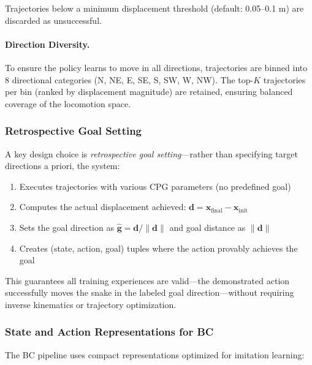 \documentclass[11pt]{article}
\begin{document}
Trajectories below a minimum displacement threshold (default: 0.05--0.1 m) are discarded as unsuccessful.

\paragraph{Direction Diversity.}
To ensure the policy learns to move in all directions, trajectories are binned into 8 directional categories (N, NE, E, SE, S, SW, W, NW). The top-$K$ trajectories per bin (ranked by displacement magnitude) are retained, ensuring balanced coverage of the locomotion space.

\subsubsection{Retrospective Goal Setting}

A key design choice is \emph{retrospective goal setting}---rather than specifying target directions a priori, the system:
\begin{enumerate}
    \item Executes trajectories with various CPG parameters (no predefined goal)
    \item Computes the actual displacement achieved: $\mathbf{d} = \mathbf{x}_{\text{final}} - \mathbf{x}_{\text{init}}$
    \item Sets the goal direction as $\hat{\mathbf{g}} = \mathbf{d} / \|\mathbf{d}\|$ and goal distance as $\|\mathbf{d}\|$
    \item Creates (state, action, goal) tuples where the action provably achieves the goal
\end{enumerate}

This guarantees all training experiences are valid---the demonstrated action successfully moves the snake in the labeled goal direction---without requiring inverse kinematics or trajectory optimization.

\subsubsection{State and Action Representations for BC}

The BC pipeline uses compact representations optimized for imitation learning:
\end{document}
